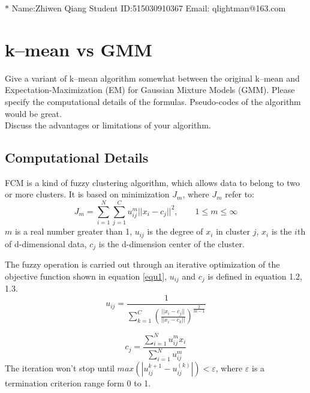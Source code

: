 \documentclass{article}
\theoremstyle{definition}
\numberwithin{equation}{section}
\numberwithin{figure}{section}
\begin{document}
\noindent

\noindent{}
\begin{center}

\footnotesize{\color{blue}$*$ Name:Zhiwen Qiang  \quad Student ID:515030910367 \quad Email: qlightman@163.com}
\end{center}

\section{k--mean vs GMM}

Give a variant of k--mean algorithm somewhat between the original k--mean and Expectation-Maximization (EM) for Gaussian Mixture Models (GMM). Please specify the computational details of the formulas. Pseudo-codes of the algorithm would be great.\\
Discuss the advantages or limitations of your algorithm.
\subsection{Computational Details}
FCM is a kind of fuzzy clustering algorithm, which allows data to belong to two or more clusters. It is based on minimization $J_m$, where $J_m$ refer to:
\begin{equation}
J_m=\sum^N_{i=1}\sum_{j=1}^{C}u_{ij}^m||x_i-c_j||^2, \qquad 1\leq m \le \infty
\label{equ1}
\end{equation}
$m$ is a real number greater than 1, $u_{ij}$ is the degree of $x_i$ in cluster $j$, $x_i$ is the $i$th of d-dimensional data, $c_j$ is the d-dimension center of the cluster.

The fuzzy operation is carried out through an iterative optimization of the objective function shown in equation \ref{equ1}, $u_{ij}$ and $c_j$ is defined in equation 1.2, 1.3.
\begin{equation}
u_{ij}=\frac{1}{\sum^C_{k=1}(\frac{||x_i-c_j||}{||x_i-c_k||})^{\frac{2}{m-1}}}
\label{euq2}
\end{equation}

\begin{equation}
c_j=\frac{\sum_{i=1}^Nu_{ij}^mx_i}{\sum_{i=1}^Nu_{ij}^m}
\label{euq3}
\end{equation}
The iteration won't stop until $max(|u_{ij}^{k+1}-u_{ij}^{(k)}|)<\varepsilon$, where $\varepsilon$ is a termination criterion range form 0 to 1.
\end{document}
